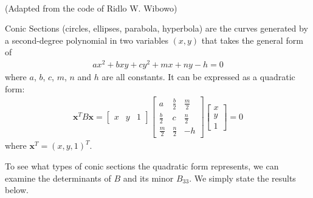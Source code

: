 \begin{center}
\\
(Adapted from the code of Ridlo W. Wibowo)
\end{center}
\begin{defn}
\label{defn:conic}
Conic Sections (circles, ellipses, parabola, hyperbola) are the curves generated by a second-degree polynomial in two variables $(x, y)$ that takes the general form of
\begin{align*}
ax^2 + bxy + cy^2 + mx + ny - h = 0
\end{align*}
where $a$, $b$, $c$, $m$, $n$ and $h$ are all constants. It can be expressed as a quadratic form:
\begin{align*}
\textbf{x}^T B\textbf{x} = 
\begin{bmatrix}
x & y & 1
\end{bmatrix}
\begin{bmatrix}
a & \frac{b}{2} & \frac{m}{2} \\
\frac{b}{2} & c & \frac{n}{2} \\
\frac{m}{2} & \frac{n}{2} & -h
\end{bmatrix}
\begin{bmatrix}
x \\
y \\
1
\end{bmatrix} = 0
\end{align*}
where $\textbf{x}^T = (x,y,1)^T$.
\end{defn}
To see what types of conic sections the quadratic form represents, we can examine the determinants of $B$ and its minor $B_{33}$. We simply state the results below.
